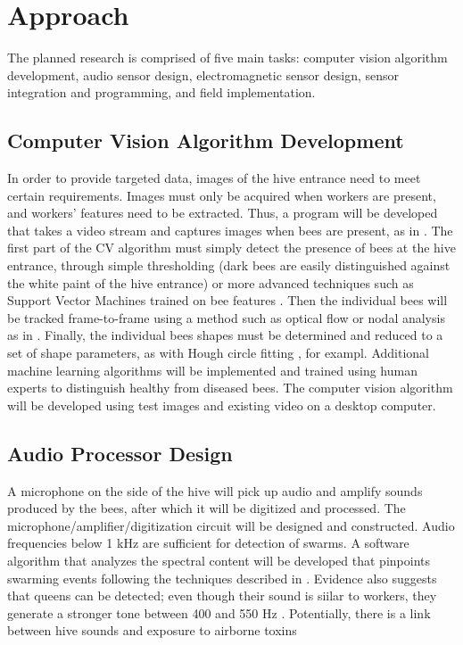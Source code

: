 \section{Approach}

The planned research is comprised of five main tasks: computer vision algorithm development, audio sensor design, electromagnetic sensor design, sensor integration and programming, and field implementation.

\subsection{Computer Vision Algorithm Development}

In order to provide targeted data, images of the hive entrance need to meet certain requirements. Images must only be acquired when workers are present, and workers' features need to be extracted. Thus, a program will be developed that takes a video stream and captures images when bees are present, as in \cite{campbell2008video}. The first part of the CV algorithm must simply detect the presence of bees at the hive entrance, through simple thresholding (dark bees are easily distinguished against the white paint of the hive entrance) or more advanced techniques such as Support Vector Machines trained on bee features \cite{azarcoya2014automatic}. Then the individual bees will be tracked frame-to-frame using a method such as optical flow \cite{horn1981determining} or nodal analysis as in \cite{campbell2008video}. Finally, the individual bees shapes must be determined and reduced to a set of shape parameters, as with Hough circle fitting \cite{yuen1990comparative}, for exampl. Additional machine learning algorithms will be implemented and trained using human experts to distinguish healthy from diseased bees. The computer vision algorithm will be developed using test images and existing video on a desktop computer.

\subsection{Audio Processor Design}

A microphone on the side of the hive will pick up audio and amplify sounds produced by the bees, after which it will  be digitized and processed. The microphone/amplifier/digitization circuit will be designed and constructed. Audio frequencies below 1 kHz are sufficient for detection of swarms. A software algorithm that analyzes the spectral content will be developed that pinpoints swarming events following the techniques described in \cite{ferrari2008monitoring}. Evidence also suggests that queens can be detected; even though their sound is siilar to workers, they generate a stronger tone between 400 and 550 Hz \cite{eren1997electronic}. Potentially, there is a link between hive sounds and exposure to airborne toxins \cite{bromenshenk2009honey}

